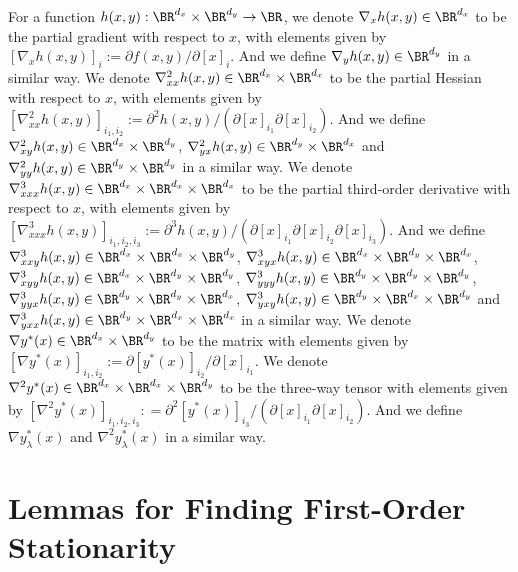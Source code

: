 For a function $h(x,y) : \BR^{d_x} \times \BR^{d_y} \rightarrow \BR$,
we denote $\nabla_x h(x,y) \in \BR^{d_x}$ to be the partial gradient with respect to $x$, with elements given by $ [\nabla_x h(x,y) ]_{i} := \partial f(x,y) / \partial [x]_{i}$. And we define $\nabla_y h(x,y) \in \BR^{d_y}$ in a similar way.  We denote $ \nabla_{xx}^2 h(x,y) \in \BR^{d_x} \times \BR^{d_x}$ to be the partial Hessian with respect to $x$, with elements given by $ [\nabla_{xx}^2 h(x,y)]_{i_1,i_2} := \partial^2 h(x,y) / (\partial [x]_{i_1} \partial [x]_{i_2})$. And we define $ \nabla_{xy}^2 h(x,y) \in \BR^{d_x} \times \BR^{d_y} $, $\nabla_{yx}^2 h(x,y) \in \BR^{d_y} \times \BR^{d_x}$ and  $ \nabla_{yy}^2 h(x,y) \in \BR^{d_y} \times \BR^{d_y}$ in a similar way.  We denote $\nabla_{xxx}^3 h(x,y) \in \BR^{d_x} \times \BR^{d_x} \times \BR^{d_x}$ to be the partial third-order derivative with respect to $x$, with elements given by 
$ [\nabla_{xxx}^3 h(x,y)]_{i_1,i_2,i_3} := \partial^3 h(x,y) / (\partial [x]_{i_1} \partial [x]_{i_2} \partial [x]_{i_3})$. And we define $\nabla_{xxy}^3 h(x,y) \in \BR^{d_x} \times \BR^{d_x} \times \BR^{d_y}$, $\nabla_{xyx}^3 h(x,y) \in \BR^{d_x} \times \BR^{d_y} \times \BR^{d_x}$,
$\nabla_{xyy}^3 h(x,y) \in \BR^{d_x} \times \BR^{d_y} \times \BR^{d_y}$,
$\nabla_{yyy}^3 h(x,y) \in \BR^{d_y} \times \BR^{d_y} \times \BR^{d_y}$,
$\nabla_{yyx}^3 h(x,y) \in \BR^{d_y} \times \BR^{d_y} \times \BR^{d_x}$,
$\nabla_{yxy}^3 h(x,y) \in \BR^{d_y} \times \BR^{d_x} \times \BR^{d_y}$
and$\nabla_{yxx}^3 h(x,y) \in \BR^{d_y} \times \BR^{d_x} \times \BR^{d_x}$
in a similar way.
We denote $\nabla y^*(x) \in \BR^{d_x} \times \BR^{d_y} $ to be the matrix with elements given by $[\nabla y^*(x) ]_{i_1,i_2} :=  \partial [y^*(x)]_{i_2}/\partial [x]_{i_1}$. We denote $\nabla^2 y^*(x) \in \BR^{d_x} \times \BR^{d_x} \times \BR^{d_y} $ to be the three-way tensor with elements given by $[\nabla^2 y^*(x)]_{i_1,i_2,i_3}: = \partial^2 [y^*(x)]_{i_3} / (\partial [x]_{i_1} \partial [x]_{i_2})$. And we define $\nabla y_{\lambda}^*(x)$ and $\nabla^2 y_{\lambda}^*(x)$ in a similar way.

\section{Lemmas for Finding First-Order Stationarity} \label{apx:lem-1st}

